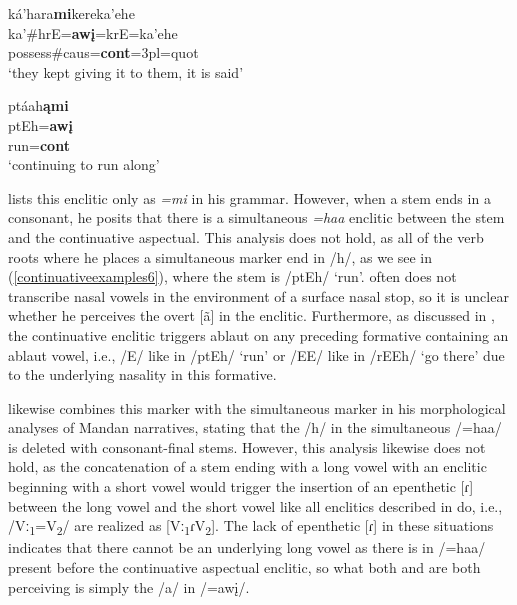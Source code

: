\begin{exe}
\begin{xlist}
	\item\label{continuativeexamples5}
	
	\glll ká'hara\textbf{mi}kereka'ehe\\
	ka'\#hrE=\textbf{awį}=krE=ka'ehe\\
	\textnormal{possess}\#caus=\textbf{cont}=3pl=quot\\
	\glt `they kept giving it to them, it is said' \citep[30]{kennard1936}
	
	\item\label{continuativeexamples6}
	
	\glll ptáah\textbf{ąmi}\\
	ptEh=\textbf{awį}\\
	\textnormal{run}=\textbf{cont}\\
	\glt `continuing to run along' \citep[30]{kennard1936}
	
	\end{xlist}

\end{exe}

\citet[30]{kennard1936} lists this enclitic only as \textit{=mi} in his grammar. However, when a stem ends in a consonant, he posits that there is a simultaneous \textit{=haa} enclitic between the stem and the continuative aspectual. This analysis does not hold, as all of the verb roots where he places a simultaneous marker end in /h/, as we see in (\ref{continuativeexamples6}), where the stem is /ptEh/ `run'. \citeauthor{kennard1936} often does not transcribe nasal vowels in the environment of a surface nasal stop, so it is unclear whether he perceives the overt [ã] in the enclitic. Furthermore, as discussed in , the continuative enclitic triggers ablaut on any preceding formative containing an ablaut vowel, i.e., /E/ like in /ptEh/ `run' or /EE/ like in /rEEh/ `go there' due to the underlying nasality in this formative.

\citet[51]{mixco1997a} likewise combines this marker with the simultaneous marker in his morphological analyses of Mandan narratives, stating that the /h/ in the simultaneous /=haa/ is deleted with consonant-final stems. However, this analysis likewise does not hold, as the concatenation of a stem ending with a long vowel with an enclitic beginning with a short vowel would trigger the insertion of an epenthetic [ɾ] between the long vowel and the short vowel like all enclitics described in  do, i.e., /Vː\textsubscript{1}=V\textsubscript{2}/ are realized as [Vː\textsubscript{1}ɾV\textsubscript{2}]. The lack of epenthetic [ɾ] in these situations indicates that there cannot be an underlying long vowel as there is in /=haa/ present before the continuative aspectual enclitic, so what both \citeauthor{kennard1936} and \citeauthor{mixco1997a} are both perceiving is simply the /a/ in /=awį/.

